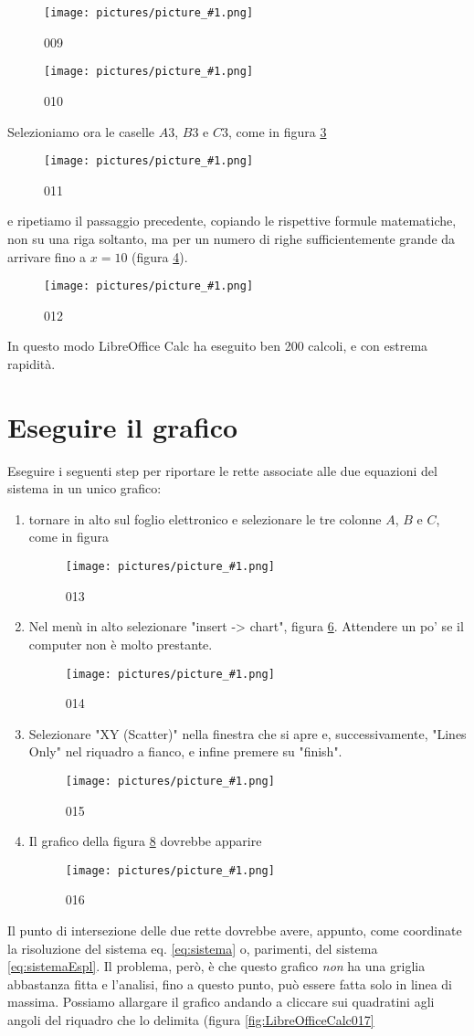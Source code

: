 \documentclass[17pt]{extarticle}
\newcommand{\pict}[1]{
\begin{figure}[h!]		
	\centering
   	\texttt{[image: pictures/picture\_\#1.png]}
  	\caption{#1}
   	\label{fig:LibreOfficeCalc#1}
\end{figure}
}
\begin{document}
%
\pict{009}

%
\pict{010}

Selezioniamo ora le caselle $A3$, $B3$ e $C3$, come in figura \ref{fig:LibreOfficeCalc011}

%
\pict{011}

e ripetiamo il passaggio precedente, copiando le rispettive formule matematiche, non su una riga soltanto, ma per un numero di righe sufficientemente grande da arrivare fino a $x = 10$ (figura \ref{fig:LibreOfficeCalc012}).

%
\pict{012}

In questo modo LibreOffice Calc ha eseguito ben 200 calcoli, e con estrema rapidità.


\section{Eseguire il grafico}


Eseguire i seguenti step per riportare le rette associate alle due equazioni del sistema in un unico grafico:

\begin{enumerate}
	\item tornare in alto sul foglio elettronico e selezionare le tre colonne $A$, $B$ e $C$, come in figura 
	
	\pict{013}	
		
	\item Nel menù in alto selezionare "insert -> chart", figura \ref{fig:LibreOfficeCalc014}. Attendere un po' se il computer non è molto prestante.
	
	\pict{014}	
	
	\item Selezionare "XY (Scatter)" nella finestra che si apre e, successivamente, "Lines Only" nel riquadro a fianco, e infine premere su "finish".
	
	\pict{015}
	
	\item Il grafico della figura \ref{fig:LibreOfficeCalc016} dovrebbe apparire

	\pict{016}

\end{enumerate}
Il punto di intersezione delle due rette dovrebbe avere, appunto, come coordinate la risoluzione del sistema eq. \ref{eq:sistema} o, parimenti, del sistema \ref{eq:sistemaEspl}. Il problema, però, è che questo grafico \emph{non} ha una griglia abbastanza fitta e l'analisi, fino a questo punto, può essere fatta solo in linea di massima. Possiamo allargare il grafico andando a cliccare sui quadratini agli angoli del riquadro che lo delimita (figura \ref{fig:LibreOfficeCalc017}
\end{document}
